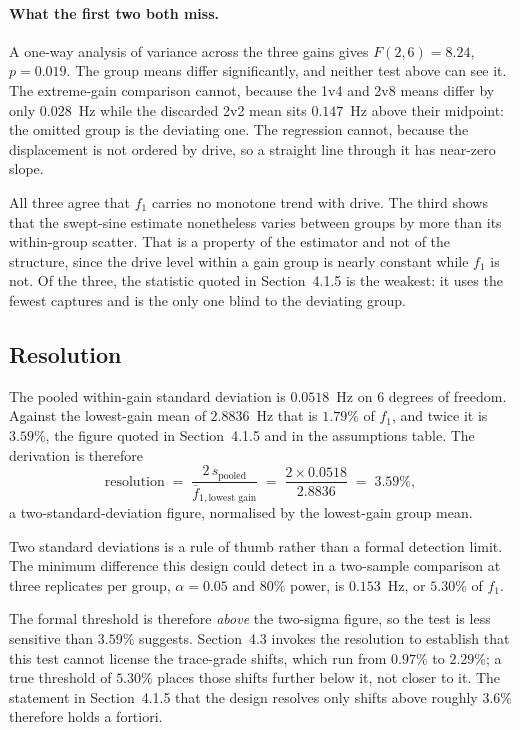 \paragraph{What the first two both miss.} A one-way analysis of variance across
the three gains gives $F(2,6) = 8.24$, $p = 0.019$. The group means differ
significantly, and neither test above can see it. The extreme-gain comparison
cannot, because the 1v4 and 2v8 means differ by only $0.028$~Hz while the
discarded 2v2 mean sits $0.147$~Hz above their midpoint: the omitted group is the
deviating one. The regression cannot, because the displacement is not ordered by
drive, so a straight line through it has near-zero slope.

All three agree that $f_1$ carries no monotone trend with drive. The third shows
that the swept-sine estimate nonetheless varies between
groups by more than its within-group scatter. That is a property of the estimator
and not of the structure, since the drive level within a gain group is nearly
constant while $f_1$ is not. Of the three, the statistic quoted in Section~4.1.5 is the weakest: it uses the
fewest captures and is the only one blind to the deviating group.

\subsection*{Resolution}

The pooled within-gain standard deviation is $0.0518$~Hz on 6 degrees of freedom.
Against the lowest-gain mean of $2.8836$~Hz that is $1.79\%$ of $f_1$, and twice
it is $3.59\%$, the figure quoted in Section~4.1.5 and in the assumptions table.
The derivation is therefore
%
\begin{equation*}
  \text{resolution} \;=\; \frac{2\,s_{\text{pooled}}}{\bar{f}_{1,\text{lowest gain}}}
  \;=\; \frac{2 \times 0.0518}{2.8836} \;=\; 3.59\%,
\end{equation*}
%
a two-standard-deviation figure, normalised by the lowest-gain group mean.

Two standard deviations is a rule of thumb rather than a formal detection limit.
The minimum difference this design could detect in a two-sample comparison at
three replicates per group, $\alpha = 0.05$ and $80\%$ power, is $0.153$~Hz, or
$5.30\%$ of $f_1$.

The formal threshold is therefore \emph{above} the two-sigma figure, so the test
is less sensitive than $3.59\%$ suggests. Section~4.3 invokes the resolution to establish that this
test cannot license the trace-grade shifts, which run from $0.97\%$ to $2.29\%$;
a true threshold of $5.30\%$ places those shifts further below it, not closer to
it. The statement in Section~4.1.5 that the design resolves only shifts above
roughly $3.6\%$ therefore holds a fortiori.

